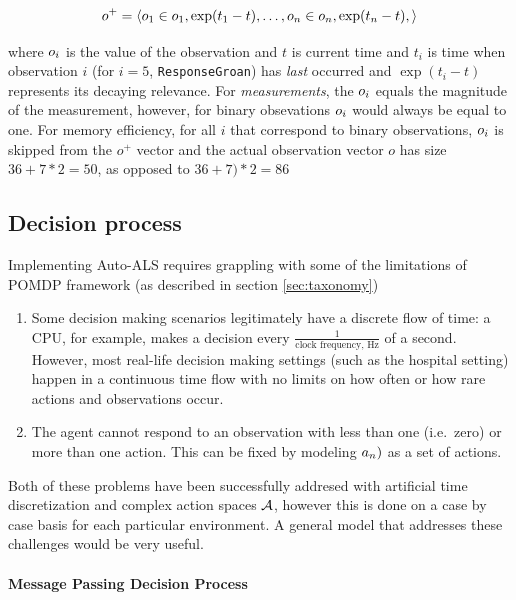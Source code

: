\begin{equation}
     o^{+} = \langle o_1 \in o_1, \exp(t_1-t), \dots, o_n \in o_n, \exp(t_n-t), \rangle
\end{equation}

where $o_i$ is the value of the observation and $t$ is current time and $t_i$ is time when observation $i$ (for $i=5$, \verb|ResponseGroan|) has \emph{last} occurred and $\exp(t_i-t)$ represents its decaying relevance.
For \emph{measurements}, the $o_i$ equals the magnitude of the measurement, however, for binary obsevations $o_i$ would always be equal to one.
For memory efficiency, for all $i$ that correspond to binary observations, $o_i$ is skipped from the $o^{+} $ vector and the actual observation vector $o$ has size $36+7*2=50$, as opposed to $36+7)*2=86$

\newpage
\subsection{Decision process}
\label{sec:mpdp}

Implementing Auto-ALS requires grappling with some of the limitations of POMDP framework (as described in section \ref{sec:taxonomy})
\begin{enumerate}
    \item Some decision making scenarios legitimately have a discrete flow of time: a CPU, for example, makes a decision every $\frac{1}{\text{clock frequency, Hz}}$ of a second. However, most real-life decision making settings (such as the hospital setting) happen in a continuous time flow with no limits on how often or how rare actions and observations occur.
    \item The agent cannot respond to an observation with less than one (i.e.~zero) or more than one action. This can be fixed by modeling $a_n)$ as a set of actions.
\end{enumerate}

Both of these problems have been successfully addresed with artificial time discretization and complex action spaces $\mathcal{A}$, however this is done on a case by case basis for each particular environment. A general model that addresses these challenges would be very useful.

\paragraph{Message Passing Decision Process}

